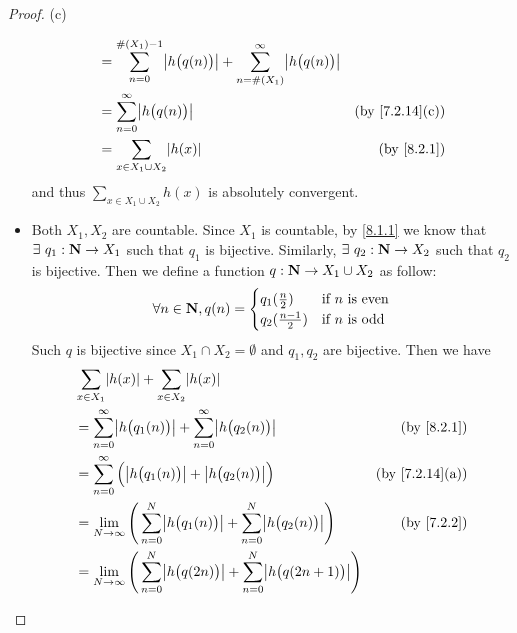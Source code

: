 \begin{proof}{(c)}
\begin{itemize}
\begin{align*}
             & = \sum_{n = 0}^{\#(X_1) - 1} \abs{h\big(q(n)\big)} + \sum_{n = \#(X_1)}^\infty \abs{h\big(q(n)\big)}                                \\
             & = \sum_{n = 0}^\infty \abs{h\big(q(n)\big)}                                                          & \text{(by \cref{7.2.14}(c))} \\
             & = \sum_{x \in X_1 \cup X_2} \abs{h(x)}                                                               & \text{(by \cref{8.2.1})}
          \end{align*}
          and thus \(\sum_{x \in X_1 \cup X_2} h(x)\) is absolutely convergent.
    \item Both \(X_1, X_2\) are countable.
          Since \(X_1\) is countable, by \cref{8.1.1} we know that \(\exists\ q_1 : \mathbf{N} \to X_1\) such that \(q_1\) is bijective.
          Similarly, \(\exists\ q_2 : \mathbf{N} \to X_2\) such that \(q_2\) is bijective.
          Then we define a function \(q : \mathbf{N} \to X_1 \cup X_2\) as follow:
          \[
            \forall n \in \mathbf{N}, q(n) = \begin{cases}
              q_1(\frac{n}{2})     & \text{if } n \text{ is even} \\
              q_2(\frac{n - 1}{2}) & \text{if } n \text{ is odd}
            \end{cases}
          \]
          Such \(q\) is bijective since \(X_1 \cap X_2 = \emptyset\) and \(q_1, q_2\) are bijective.
          Then we have
          \begin{align*}
             & \sum_{x \in X_1} \abs{h(x)} + \sum_{x \in X_2} \abs{h(x)}                                                                                          \\
             & = \sum_{n = 0}^\infty \abs{h\big(q_1(n)\big)} + \sum_{n = 0}^\infty \abs{h\big(q_2(n)\big)}                         & \text{(by \cref{8.2.1})}     \\
             & = \sum_{n = 0}^\infty \Big(\abs{h\big(q_1(n)\big)} + \abs{h\big(q_2(n)\big)}\Big)                                   & \text{(by \cref{7.2.14}(a))} \\
             & = \lim_{N \to \infty} \Bigg(\sum_{n = 0}^N \abs{h\big(q_1(n)\big)} + \sum_{n = 0}^N \abs{h\big(q_2(n)\big)}\Bigg)   & \text{(by \cref{7.2.2})}     \\
             & = \lim_{N \to \infty} \Bigg(\sum_{n = 0}^N \abs{h\big(q(2n)\big)} + \sum_{n = 0}^N \abs{h\big(q(2n + 1)\big)}\Bigg)                                \\

\end{align*}
\end{itemize}
\end{proof}
